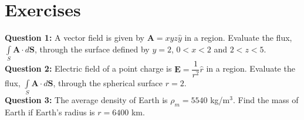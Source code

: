 \documentclass[12pt,a4paper]{article}
\begin{document}
\section{Exercises}
\noindent\textbf{Question 1:} A vector field is given by $\textbf{A}=xyz\hat y$ in a region. Evaluate the flux, $\int\limits_{S}\textbf{A}\cdot d\textbf{S}$, through the surface defined by $y=2$, $0<x<2$ and $2<z<5$.\\[0.2cm]
\noindent\textbf{Question 2:} Electric field of a point charge is $\textbf{E}=\dfrac{1}{r^2}\hat r$ in a region. Evaluate the flux, $\int\limits_{S}\textbf{A}\cdot d\textbf{S}$, through the spherical surface $r=2$.\\[0.2cm]
\noindent\textbf{Question 3:} The average density of Earth is $\rho_m=5540$ kg/m$^3$. Find the mass of Earth if Earth's radius is $r=6400$ km.\\[0.2cm]


\end{document}
